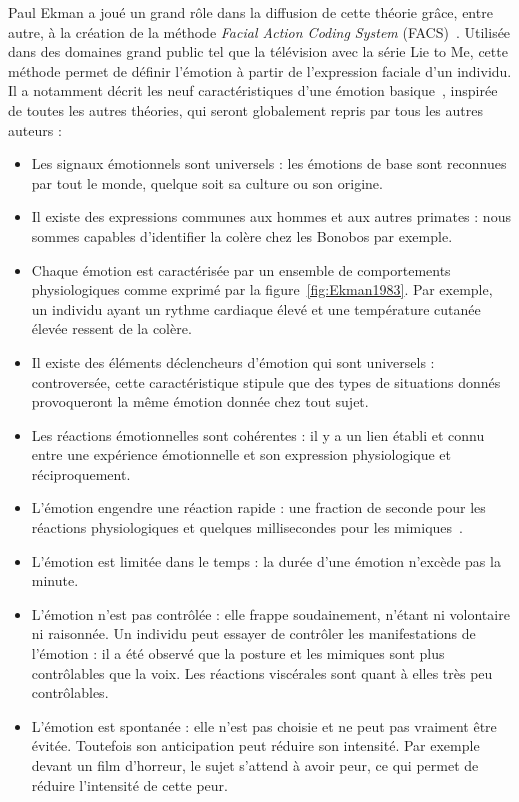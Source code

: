 Paul Ekman a joué un grand rôle dans la diffusion de cette théorie grâce, entre autre, à la création de la méthode \textit{Facial Action Coding System} (FACS)~\cite{Ekman1978}. Utilisée dans des domaines grand public tel que la télévision avec la série Lie to Me, cette méthode permet de définir l'émotion à partir de l'expression faciale d'un individu. Il a notamment décrit les neuf caractéristiques d'une émotion basique~\cite{Ekman1999}, inspirée de toutes les autres théories, qui seront globalement repris par tous les autres auteurs :
\begin{itemize}
  \item Les signaux émotionnels sont universels : les émotions de base sont reconnues par tout le monde, quelque soit sa culture ou son origine.
  \item Il existe des expressions communes aux hommes et aux autres primates : nous sommes capables d'identifier la colère chez les Bonobos par exemple.
  \item Chaque émotion est caractérisée par un ensemble de comportements physiologiques comme exprimé par la figure~\ref{fig:Ekman1983}. Par exemple, un individu ayant un rythme cardiaque élevé et une température cutanée élevée ressent de la colère.
  
  \item Il existe des éléments déclencheurs d'émotion qui sont universels : controversée, cette caractéristique stipule que des types de situations donnés provoqueront la même émotion donnée chez tout sujet.
  \item Les réactions émotionnelles sont cohérentes : il y a un lien établi et connu entre une expérience émotionnelle et son expression physiologique et réciproquement.
  \item L'émotion engendre une réaction rapide : une fraction de seconde pour les réactions physiologiques et quelques millisecondes pour les mimiques~\cite{Ekman1978}.
  \item L'émotion est limitée dans le temps : la durée d'une émotion n'excède pas la minute.
  \item L'émotion n'est pas contrôlée : elle frappe soudainement, n'étant ni volontaire ni raisonnée. Un individu peut essayer de contrôler les manifestations de l'émotion : il a été observé que la posture et les mimiques sont plus contrôlables que la voix. Les réactions viscérales sont quant à elles très peu contrôlables.
  \item L'émotion est spontanée : elle n'est pas choisie et ne peut pas vraiment être évitée. Toutefois son anticipation peut réduire son intensité. Par exemple devant un film d'horreur, le sujet s'attend à avoir peur, ce qui permet de réduire l'intensité de cette peur.
\end{itemize}


